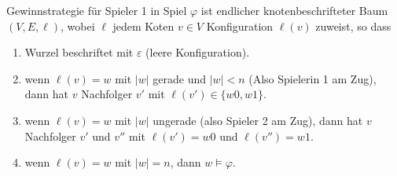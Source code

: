 \begin{definition}[Gewinnstrategie]

Gewinnstrategie für Spieler 1 in Spiel $\varphi$ ist endlicher
knotenbeschrifteter Baum $(V,E,\ell)$, wobei $\ell$ jedem Koten
$v \in V$ Konfiguration $\ell(v)$ zuweist, so dass
\end{definition}
\begin{enumerate}[label={(\alph*)}]
\item
  Wurzel beschriftet mit $\varepsilon$ (leere Konfiguration).
\item
  wenn $\ell\left( v \right) = w$ mit $\left| w \right|$ gerade und
  $\left| w \right| < n$ (Also Spielerin 1 am Zug), dann hat $v$
  Nachfolger $v'$ mit $\ell\left( v' \right) \in \{ w0,w1\}$.
\item
  wenn $\ell\left( v \right) = w$ mit $|w|$ ungerade
  (also Spieler 2 am Zug), dann hat $v$ Nachfolger $v'$ und
  $v''$ mit $\ell\left( v' \right) = w0$ und
  $\ell\left( v'' \right) = w1$.
\item
  wenn $\ell\left( v \right) = w$ mit $\left| w \right| = n$, dann
  $w \models \varphi$.
\end{enumerate}

\begin{tafel}\mbox{}
    \begin{center}
    \end{center}
\end{tafel}


